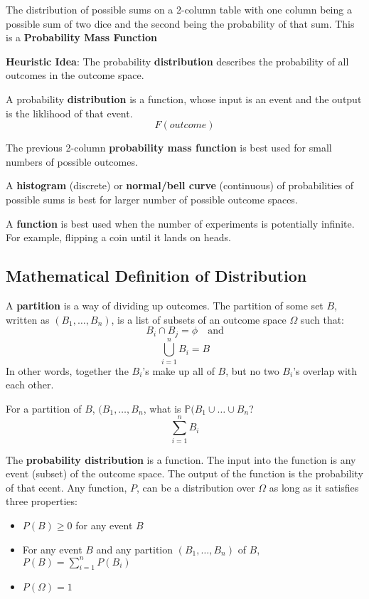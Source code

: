 \documentclass[titlepage, 12pt, leqno]{article}
\begin{document}
The distribution of possible sums on a 2-column table with one column being a possible sum of two dice and the second being the probability of that sum. This is a \textbf{Probability Mass Function} 

\textbf{Heuristic Idea}: 
The probability \textbf{distribution} describes the probability of all outcomes in the outcome space.

\begin{definition}
    A probability \textbf{distribution} is a function, whose input is an event and the output is the liklihood of that event.
    \[
    F(outcome)
    \]
\end{definition}

The previous 2-column \textbf{probability mass function} is best used for small numbers of possible outcomes.

A \textbf{histogram} (discrete) or \textbf{normal/bell curve} (continuous) of probabilities of possible sums is best for larger number of possible outcome spaces.

A \textbf{function} is best used  when the number of experiments is potentially infinite. For example, flipping a coin until it lands on heads.

\subsection{Mathematical Definition of Distribution}
\begin{definition}
    A \textbf{partition} is a way of dividing up outcomes. The partition of some set $B$, written as $(B_1,\dots,B_n)$, is a list of subsets of an outcome space $\Omega$ such that:
    \[
    B_i \cap B_j = \phi \quad \text{and}
    \]
    \[
    \bigcup_{i=1}^{n}B_i = B
    \]
   In other words, together the $B_i$'s make up all of $B$, but no two $B_i$'s overlap with each other.
\end{definition}

\begin{ex}
    For a partition of $B$, $(B_1, \dots, B_n$, what is $\mathbb{P}(B_1 \cup \dots \cup B_n$?
\[
    \boxed{\sum_{i=1}^{n}B_i} 
\]
\end{ex}

The \textbf{probability distribution} is a function. The input into the function is any event (subset) of the outcome space. The output of the function is the probability of that ecent. Any function, $P$, can be a distribution over $\Omega$ as long as it satisfies three properties:
\begin{itemize}
    \item $P(B) \ge 0$ for any event $B$ 
    \item For any event $B$ and any partition $(B_1, \dots, B_n)$ of $B$, $P(B) = \sum_{i=1}^{n}P(B_i)$ 
    \item $P(\Omega) = 1$ 
\end{itemize}
\end{document}
